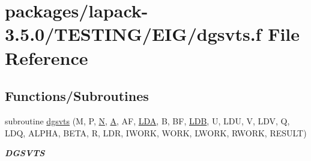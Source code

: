 \hypertarget{dgsvts_8f}{}\section{packages/lapack-\/3.5.0/\+T\+E\+S\+T\+I\+N\+G/\+E\+I\+G/dgsvts.f File Reference}
\label{dgsvts_8f}
\subsection*{Functions/\+Subroutines}
\begin{DoxyCompactItemize}
\item 
subroutine \hyperlink{group__double__eig_gae3ad62ba253b56ff68e7007244ce988e}{dgsvts} (M, P, \hyperlink{polmisc_8c_a0240ac851181b84ac374872dc5434ee4}{N}, \hyperlink{classA}{A}, A\+F, \hyperlink{example__user_8c_ae946da542ce0db94dced19b2ecefd1aa}{L\+D\+A}, B, B\+F, \hyperlink{example__user_8c_a50e90a7104df172b5a89a06c47fcca04}{L\+D\+B}, U, L\+D\+U, V, L\+D\+V, Q, L\+D\+Q, A\+L\+P\+H\+A, B\+E\+T\+A, R, L\+D\+R, I\+W\+O\+R\+K, W\+O\+R\+K, L\+W\+O\+R\+K, R\+W\+O\+R\+K, R\+E\+S\+U\+L\+T)
\begin{DoxyCompactList}\small\item\em {\bfseries D\+G\+S\+V\+T\+S} \end{DoxyCompactList}\end{DoxyCompactItemize}
